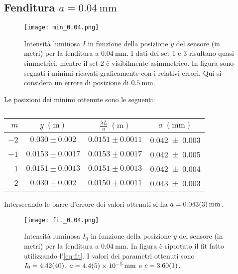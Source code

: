 \documentclass[../main.tex]{subfiles}
\begin{document}
\subsection{Fenditura $a = \qty{0.04}{\milli\metre}$}

\begin{figure}[ht!]
    \centering
    \texttt{[image: min\_0.04.png]}
    \caption{Intensità luminosa $I$ in funzione della posizione $y$ del sensore (in metri) per la fenditura a $\qty{0.04}{\mm}$. I dati dei set 1 e 3 risultano quasi simmetrici, mentre il set 2 è visibilmente asimmetrico. In figura sono segnati i minimi ricavati graficamente con i relativi errori. Qui si considera un errore di posizione di $\qty{0.5}{\mm}$.} %
    \label{fig:minimi 0.04}
\end{figure}

Le posizioni dei minimi ottenute sono le seguenti:

\begin{table}[ht!]
    \centering
    \caption{}
    \begin{tabular}{r|cc|c}
        \toprule
        $m$  & $y \; (\si{\metre})$ & $\frac{\lambda L}{a} \; (\si{\metre})$ & $a \; (\si{\mm})$  \\
        \midrule
        $-2$ & $0.030 \pm 0.002$    & $0.0151 \pm 0.0011$                    & \num{0.042+-0.003} \\
        $-1$ & $0.0153 \pm 0.0017$  & $0.0153 \pm 0.0017$                    & \num{0.042+-0.005} \\
        $1$  & $0.0151 \pm 0.0013$  & $0.0151 \pm 0.0013$                    & \num{0.042+-0.004} \\
        $2$  & $0.030 \pm 0.002$    & $0.0150 \pm 0.0011$                    & \num{0.043+-0.003} \\
        \bottomrule
    \end{tabular}
    \label{tab:minimi 0.04}
\end{table}

Intersecando le barre d'errore dei valori ottenuti si ha $a = \qty{0.043+-0.003}{\mm}$.



\begin{figure}[ht!]
    \centering
    \texttt{[image: fit\_0.04.png]}
    \caption{Intensità luminosa $I_{0}$ in funzione della posizione $y$ del sensore (in metri) per la fenditura a $\qty{0.04}{\mm}$. In figura è riportato il fit fatto utilizzando l'\autoref{eq:fit}. I valori dei parametri ottenuti sono $I_{0} = \num{4.42+-0.4}$, $a = \qty{4.4+-0.5e-5}{\mm}$ e $c = \num{3.60+-0.01}$. }
    \label{fig:fit 0.04}
\end{figure}
\end{document}
